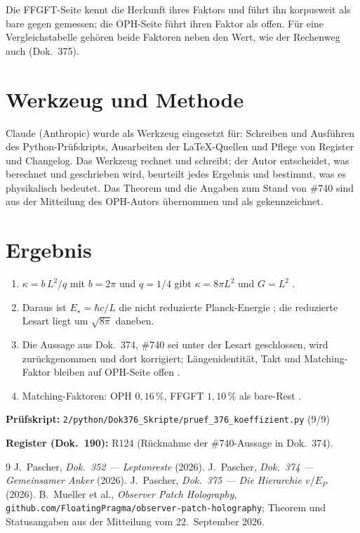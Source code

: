 Die FFGFT-Seite kennt die Herkunft ihres Faktors und führt ihn korpusweit als
bare gegen gemessen; die OPH-Seite führt ihren Faktor als offen. Für eine
Vergleichstabelle gehören beide Faktoren neben den Wert, wie der Rechenweg
auch (Dok.~375).

\section*{Werkzeug und Methode}
Claude (Anthropic) wurde als Werkzeug eingesetzt für: Schreiben und Ausführen
des Python-Prüfskripts, Ausarbeiten der \LaTeX-Quellen und Pflege von Register
und Changelog. Das Werkzeug rechnet und schreibt; der Autor entscheidet, was
berechnet und geschrieben wird, beurteilt jedes Ergebnis und bestimmt, was es
physikalisch bedeutet. Das Theorem und die Angaben zum Stand von \#740 sind
aus der Mitteilung des OPH-Autors übernommen und als \QM{} gekennzeichnet.

\section{Ergebnis}

\begin{enumerate}
\item $\kappa=b\,L^2/q$ mit $b=2\pi$ und $q=1/4$ gibt $\kappa=8\pi L^2$ und
  $G=L^2$ \KM{} \QM.
\item Daraus ist $E_\star=\hbar c/L$ die nicht reduzierte Planck-Energie \BM;
  die reduzierte Lesart liegt um $\sqrt{8\pi}$ daneben.
\item Die Aussage aus Dok.~374, \#740 sei unter der Lesart geschlossen, wird
  zurückgenommen und dort korrigiert; Längenidentität, Takt und Matching-Faktor bleiben auf
  OPH-Seite offen \QM.
\item Matching-Faktoren: OPH $0{,}16\,\%$, FFGFT $1{,}10\,\%$ als bare-Rest
  \KM.
\end{enumerate}

\medskip
\noindent\textbf{Prüfskript:} \texttt{2/python/Dok376\_Skripte/pruef\_376\_koeffizient.py} (9/9)

\medskip
\noindent\textbf{Register (Dok.~190):} R124 (Rücknahme der \#740-Aussage in Dok.~374).

\begin{thebibliography}{9}
 J.~Pascher, \emph{Dok.~352 --- Leptonreste} (2026).
 J.~Pascher, \emph{Dok.~374 --- Gemeinsamer Anker} (2026).
 J.~Pascher, \emph{Dok.~375 --- Die Hierarchie $v/E_P$} (2026).
 B.~Mueller et al., \emph{Observer Patch Holography},
  \texttt{github.com/FloatingPragma/observer-patch-holography}; Theorem und
  Statusangaben aus der Mitteilung vom 22.~September 2026.
\end{thebibliography}
